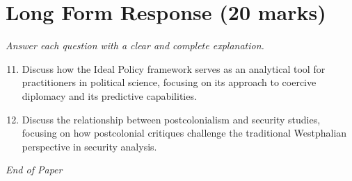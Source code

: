 \documentclass[12pt]{article}
\begin{document}
\section*{Long Form Response (20 marks)}
\textit{Answer each question with a clear and complete explanation.}
\begin{enumerate}[label=\arabic*.]
\setcounter{enumi}{10}
\item Discuss how the Ideal Policy framework serves as an analytical tool for practitioners in political science, focusing on its approach to coercive diplomacy and its predictive capabilities.
\item Discuss the relationship between postcolonialism and security studies, focusing on how postcolonial critiques challenge the traditional Westphalian perspective in security analysis.
\end{enumerate}

\vfill
\noindent\textit{End of Paper}
\end{document}
